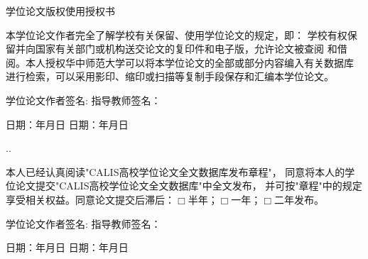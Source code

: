 \begin{center}
    \parbox[t][2cm][c]{\textwidth}{ {\sanhao \bf \kai \centerline
    {学位论文版权使用授权书} } }
    \parbox[t][3cm][c]{\textwidth}{\xiaosihao
    \hspace{2em}本学位论文作者完全了解学校有关保留、使用学位论文的规定，即：
    学校有权保留并向国家有关部门或机构送交论文的复印件和电子版，允许论文被查阅
    和借阅。本人授权华中师范大学可以将本学位论文的全部或部分内容编入有关数据库
    进行检索，可以采用影印、缩印或扫描等复制手段保存和汇编本学位论文。}
   \parbox[t][1.7cm][c]{\textwidth}{\fontsize{12pt}{15pt}\selectfont
   \hspace{2em}\fs
   学位论文作者签名:
   \hspace*{3.5cm}
   指导教师签名：}
   \parbox[t][1.8cm][c]{\textwidth}{\fontsize{12pt}{15pt}\selectfont
   \hspace{2em}\fs 日期：\hspace{2em}年\hspace{2em}月\hspace{2em}日
    \hspace*{2.3cm}日期：\hspace{2em}年\hspace{2em}月\hspace{2em}日
  \vspace{1.5cm}
}
 .\dotfill .
    \parbox[t][2cm][c]{\textwidth}{ {\fontsize{12pt}{18pt}\selectfont
    \hspace{2em}本人已经认真阅读"CALIS高校学位论文全文数据库发布章程"，
    同意将本人的学位论文提交"CALIS高校学位论文全文数据库"中全文发布，
    并可按"章程"中的规定享受相关权益。同意论文提交后滞后：$\Box$半年；$\Box$一年；$\Box$二年发布。}}
   \parbox[t][1.5cm][c]{\textwidth}{\fontsize{12pt}{15pt}\selectfont
   \hspace{2em}\fs
   学位论文作者签名:
   \hspace*{3.5cm}
   指导教师签名：}
   \parbox[t][0.4cm][c]{\textwidth}{\fontsize{12pt}{15pt}\selectfont
   \hspace{2em}\fs 日期：\hspace{2em}年\hspace{2em}月\hspace{2em}日
    \hspace*{2.3cm}日期：\hspace{2em}年\hspace{2em}月\hspace{2em}日
    }
    \end{center}